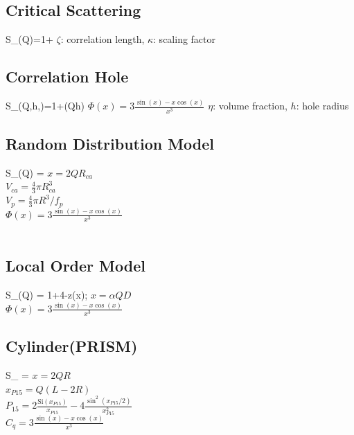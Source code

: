
\clearpage
\subsection{Critical Scattering}

\BE S_(Q)=1+ \EE $\zeta$:
correlation length, $\kappa$: scaling factor



\subsection{Correlation Hole}
\BE S_(Q,h,\eta)=1+\eta \Phi(Qh) \EE $\Phi(x) =
3\frac{\sin(x)-x\cos(x)}{x^3}$ $\eta$: volume fraction, $h$: hole
radius


\subsection{Random Distribution Model}

\BE S_(Q) =
 \EE
$x = 2QR_{ca}$ \\
$V_{ca} = \frac{4}{3}\pi R_{ca}^3$ \\
$V_p  = \frac{4}{3}\pi R^3/f_p$ \\
$\Phi(x) = 3\frac{\sin(x)-x\cos(x)}{x^3}$\\
~\\


\subsection{Local Order Model}

\BE S_(Q) = 1+4-z\Phi(x); \EE
$x = \alpha Q D$\\
$\Phi(x) = 3\frac{\sin(x)-x\cos(x)}{x^3}$


\subsection{Cylinder(PRISM)}

\BE S_ =  \EE
$x = 2QR$ \\[3mm]
$x_{P15} = Q(L-2R)$ \\[3mm]
$\displaystyle P_{15} = 2\frac{\text{Si}(x_{P15})}{x_{P15}} - 4\frac{\sin^2(x_{P15}/2)}{x_{P15}^2}$ \\[3mm]
$\displaystyle C_q = 3\frac{\sin(x)-x\cos(x)}{x^3}$ \\

